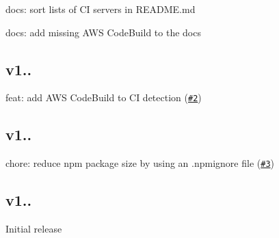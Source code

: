 \begin{DoxyItemize}
\item docs\+: sort lists of CI servers in R\+E\+A\+D\+M\+E.\+md
\item docs\+: add missing A\+WS Code\+Build to the docs
\end{DoxyItemize}

\subsection*{v1..}


\begin{DoxyItemize}
\item feat\+: add A\+WS Code\+Build to CI detection (\href{https://github.com/watson/ci-info/pull/2}{\tt \#2})
\end{DoxyItemize}

\subsection*{v1..}


\begin{DoxyItemize}
\item chore\+: reduce npm package size by using an {\ttfamily .npmignore} file (\href{https://github.com/watson/ci-info/pull/3}{\tt \#3})
\end{DoxyItemize}

\subsection*{v1..}


\begin{DoxyItemize}
\item Initial release 
\end{DoxyItemize}